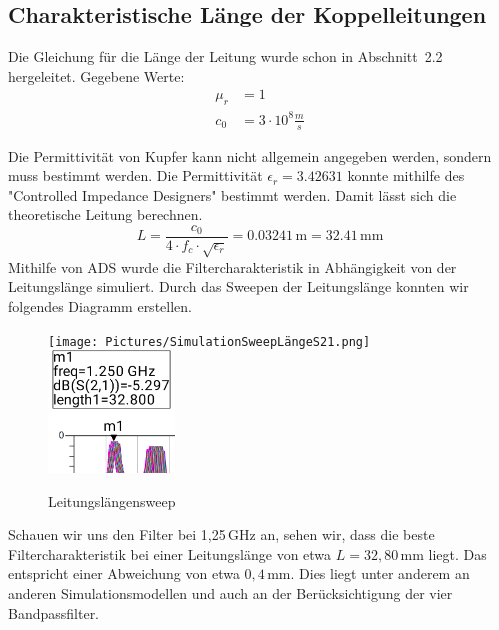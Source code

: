 \subsection{Charakteristische Länge der Koppelleitungen}
Die Gleichung für die Länge der Leitung wurde schon in Abschnitt~2.2 hergeleitet.
Gegebene Werte:
\begin{align}
    \mu_r &= 1 \\
    c_0 &= 3 \cdot 10^8 \frac{m}{s}
\end{align}

Die Permittivität von Kupfer kann nicht allgemein angegeben werden, sondern muss bestimmt werden. 
Die Permittivität $\epsilon_r = 3.42631$ konnte mithilfe des "Controlled Impedance Designers" bestimmt werden. Damit lässt sich die theoretische Leitung berechnen.
\begin{equation}
    L = \frac{c_0}{4 \cdot f_c \cdot \sqrt{\epsilon_r}} = 0.03241\,\mathrm{m} = 32.41\,\mathrm{mm}
    \label{eq:laenge}
\end{equation}
\clearpage
Mithilfe von ADS wurde die Filtercharakteristik in Abhängigkeit von der Leitungslänge simuliert. Durch das Sweepen der 
Leitungslänge konnten wir folgendes Diagramm erstellen.
\begin{figure}[H]
    \texttt{[image: Pictures/SimulationSweepLängeS21.png]}
    \includegraphics[width=0.3\textwidth]{Pictures/gezoomt.png}
    \centering
    \caption{Leitungslängensweep}
\end{figure}
Schauen wir uns den Filter bei 1,25\,GHz an, sehen wir, dass die beste Filtercharakteristik bei einer
Leitungslänge von etwa $L=32{,}80\,\mathrm{mm}$ liegt.
Das entspricht einer Abweichung von etwa $0{,}4\,\mathrm{mm}$. Dies liegt unter anderem an anderen 
Simulationsmodellen und auch an der Berücksichtigung der vier Bandpassfilter.

\clearpage
